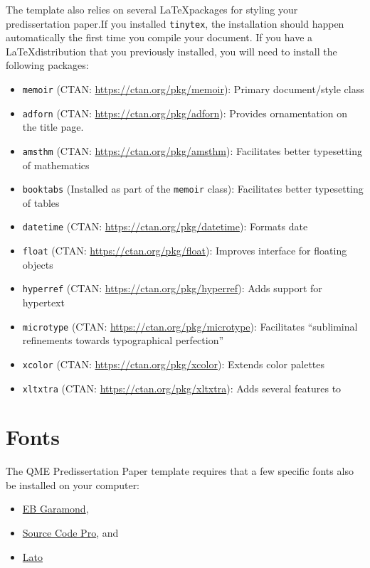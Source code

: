\documentclass[12pt,letterpaper,oneside,oldfontcommands]{memoir}
\providecommand{\tightlist}{%
  \setlength{\itemsep}{0pt}\setlength{\parskip}{0pt}}
\theoremstyle{definition}
\theoremstyle{definition}
\theoremstyle{definition}
\theoremstyle{remark}
\begin{document}
The template also relies on several \LaTeX packages for styling your
predissertation paper.If you installed \texttt{tinytex}, the
installation should happen automatically the first time you compile your
document. If you have a \LaTeX distribution that you previously
installed, you will need to install the following packages:

\begin{itemize}
\tightlist
\item
  \texttt{memoir} (CTAN: \url{https://ctan.org/pkg/memoir}): Primary
  document/style class
\item
  \texttt{adforn} (CTAN: \url{https://ctan.org/pkg/adforn}): Provides
  ornamentation on the title page.
\item
  \texttt{amsthm} (CTAN: \url{https://ctan.org/pkg/amsthm}): Facilitates
  better typesetting of mathematics
\item
  \texttt{booktabs} (Installed as part of the \texttt{memoir} class):
  Facilitates better typesetting of tables
\item
  \texttt{datetime} (CTAN: \url{https://ctan.org/pkg/datetime}): Formats
  date
\item
  \texttt{float} (CTAN: \url{https://ctan.org/pkg/float}): Improves
  interface for floating objects
\item
  \texttt{hyperref} (CTAN: \url{https://ctan.org/pkg/hyperref}): Adds
  support for hypertext
\item
  \texttt{microtype} (CTAN: \url{https://ctan.org/pkg/microtype}):
  Facilitates ``subliminal refinements towards typographical
  perfection''
\item
  \texttt{xcolor} (CTAN: \url{https://ctan.org/pkg/xcolor}): Extends
  color palettes
\item
  \texttt{xltxtra} (CTAN: \url{https://ctan.org/pkg/xltxtra}): Adds
  several features to \XeLaTeX
\end{itemize}

\hypertarget{fonts}{%
\section{Fonts}\label{fonts}}

The QME Predissertation Paper template requires that a few specific
fonts also be installed on your computer:

\begin{itemize}
\tightlist
\item
  \href{https://github.com/georgd/EB-Garamond}{EB Garamond},
\item
  \href{https://github.com/adobe-fonts/source-code-pro/}{Source Code
  Pro}, and
\item
  \href{http://www.latofonts.com/lato-free-fonts/}{Lato}
\end{itemize}
\end{document}
